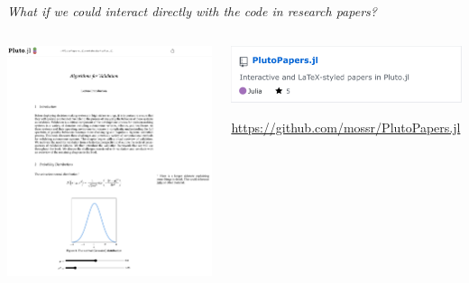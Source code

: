 \begin{frame}[fragile]{} \pause

\centering
\textit{What if we could interact directly with the code in research papers?}

\end{frame}


\begin{frame}[fragile]{}

\begin{columns}
  \hfill
  \begin{column}{0.35\textwidth}
    \centering
    \includegraphics[width=\linewidth]{media/plutopapers-tufte-light.png}

  \end{column}
  \pause
  \begin{column}{0.54\textwidth}
    \includegraphics[width=0.85\linewidth]{media/PlutoPapers.jl.png}

    \textcolor{repo}{\small \url{https://github.com/mossr/PlutoPapers.jl}}
  \end{column}
  \hfill
\end{columns}
    
\end{frame}